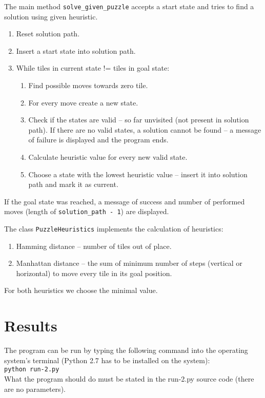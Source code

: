 \documentclass{article}
\begin{document}
The main method \verb|solve_given_puzzle| accepts a start state and tries to find a solution using given heuristic. 
\begin{enumerate}
\item Reset solution path.
\item Insert a start state into solution path.
\item While tiles in current state != tiles in goal state:
	\begin{enumerate}
	\item Find possible moves towards zero tile.
           \item For every move create a new state.
           \item Check if the states are valid -- so far unvisited (not present in solution path). If there are no valid states, a solution cannot be found -- a message of failure is displayed and the program ends.
           \item Calculate heuristic value for every new valid state.
           \item Choose a state with the lowest heuristic value -- insert it into solution path and mark it as current.
	\end{enumerate}
\end{enumerate}

If the goal state was reached, a message of success and number of performed moves (length of \texttt{solution\_path - 1}) are displayed. 

The class \texttt{PuzzleHeuristics} implements the calculation of heuristics:
\begin{enumerate}
\item Hamming distance -- number of tiles out of place.
\item Manhattan distance -- the sum of minimum number of steps (vertical or horizontal) to move every tile in its goal position.
\end{enumerate}
For both heuristics we choose the minimal value. 

\section{Results}
The program can be run by typing the following command into the operating system's terminal (Python 2.7 has to be installed on the system): \\ 
\verb|python run-2.py| \\
What the program should do must be stated in the run-2.py source code (there are no parameters).
\end{document}
